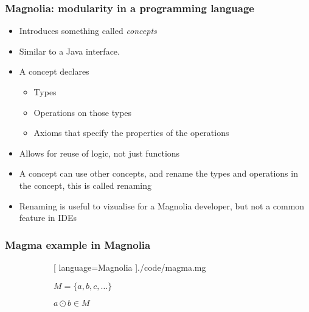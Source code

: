 \begin{frame}
  \frametitle{Magnolia: modularity in a programming language}
  \begin{itemize}
    \item Introduces something called \textit{concepts}
    \item Similar to a Java interface.
    \item A concept declares
      \begin{itemize}
        \item Types
        \item Operations on those types
        \item Axioms that specify the properties of the operations
      \end{itemize}
    \item Allows for reuse of logic, not just functions
    \item A concept can use other concepts, and rename the types and operations
      in the concept, this is called renaming
    \item Renaming is useful to vizualise for a Magnolia developer, but not a
    common feature in IDEs
  \end{itemize}
\end{frame}

\showlogo

\begin{frame}
  \frametitle{Magma example in Magnolia}
  \begin{figure}[H]
    \begin{subfigure}[h]{0.45\textwidth}
  \begin{center}
    
    [ language=Magnolia
    ]{./code/magma.mg}
  \end{center}
    \end{subfigure}
    \hfill
    \begin{subfigure}[h]{0.45\textwidth}
      \begin{center}
        $M = \{ a, b, c, \dots \}$
      \end{center}
      \begin{center}
        $a \odot b \in M$
      \end{center}
    \end{subfigure}
  \end{figure}
\end{frame}

